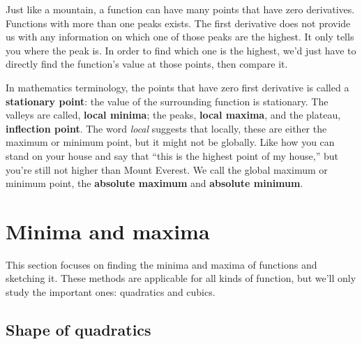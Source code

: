 Just like a mountain, a function can have many points that have zero derivatives. Functions with more than one peaks exists. The first derivative does not provide us with any information on which one of those peaks are the highest. It only tells you where the peak is. In order to find which one is the highest, we'd just have to directly find the function's value at those points, then compare it.

In mathematics terminology, the points that have zero first derivative is called a \textbf{stationary point}: the value of the surrounding function is stationary. The valleys are called, \textbf{local minima}; the peaks, \textbf{local maxima}, and the plateau, \textbf{inflection point}. The word \emph{local} suggests that locally, these are either the maximum or minimum point, but it might not be globally. Like how you can stand on your house and say that \enquote{this is the highest point of my house,} but you're still not higher than Mount Everest. We call the global maximum or minimum point, the \textbf{absolute maximum} and \textbf{absolute minimum}. 

\section{Minima and maxima}
\label{sec:minima-and-maxima}

This section focuses on finding the minima and maxima of functions and sketching it. These methods are applicable for all kinds of function, but we'll only study the important ones: quadratics and cubics.

\subsection{Shape of quadratics}

